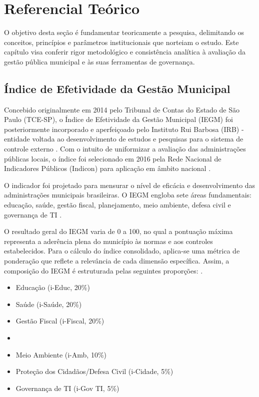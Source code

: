 \chapter{Referencial Teórico}
O objetivo desta seção é fundamentar teoricamente a pesquisa, delimitando os conceitos, princípios e 
parâmetros institucionais que norteiam o estudo. Este capítulo visa conferir rigor metodológico e 
consistência analítica à avaliação da gestão pública municipal e às suas ferramentas de governança.

\section{Índice de Efetividade da Gestão Municipal}
Concebido originalmente em 2014 pelo Tribunal de Contas do Estado de São Paulo (TCE-SP), o Índice de 
Efetividade da Gestão Municipal (IEGM) foi posteriormente incorporado e aperfeiçoado pelo Instituto 
Rui Barbosa (IRB) - entidade voltada ao desenvolvimento de estudos e pesquisas para o sistema de 
controle externo \cite{iegm_ceara_2022}. Com o intuito de uniformizar a avaliação das administrações 
públicas locais, o índice foi selecionado em 2016 pela Rede Nacional de Indicadores Públicos 
(Indicon) para aplicação em âmbito nacional \cite{iegm_ceara_2022}.

O indicador foi projetado para mensurar o nível de eficácia e desenvolvimento das 
administrações municipais brasileiras. O IEGM engloba sete áreas fundamentais: educação, saúde, 
gestão fiscal, planejamento, meio ambiente, defesa civil e governança de TI \cite{lima_influencia_2023}.

O resultado geral do IEGM varia de 0 a 100, no qual a pontuação máxima representa a aderência 
plena do município às normas e aos controles estabelecidos. Para o cálculo do índice consolidado, 
aplica-se uma métrica de ponderação que reflete a relevância de cada dimensão específica. Assim, a 
composição do IEGM é estruturada pelas seguintes proporções:
\cite{lima_influencia_2023}.


\begin{itemize}
  \item Educação (i-Educ, 20\%)
  \item Saúde (i-Saúde, 20\%)
  \item Gestão Fiscal (i-Fiscal, 20\%)
  \item {}
  \item Meio Ambiente (i-Amb, 10\%)
  \item Proteção dos Cidadãos/Defesa Civil (i-Cidade, 5\%)
  \item Governança de TI (i-Gov TI, 5\%)
\end{itemize}


